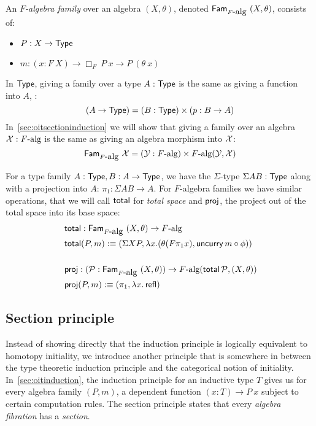 \documentclass[a4paper,10pt]{article}
\begin{document}
\begin{defn}
  An \emph{$F$-algebra family} over an algebra $(X,\theta)$, denoted
  $\mathsf{Fam}_{F\mbox{-alg}}\ (X,\theta)$, consists of:

  \begin{itemize}
  \item $P : X \to \mathsf{Type}$
  \item $m : (x : F\ X) \to \Box_F\ P\ x \to P\ (\theta\ x)$
  \end{itemize}
\end{defn}

In $\mathsf{Type}$, giving a family over a type $A : \mathsf{Type}$ is the same as
giving a function into $A$, \ie:
$$
(A \to \mathsf{Type}) = (B : \mathsf{Type}) \times (p : B \to A)
$$
In~\cref{sec:oitsectioninduction} we will show that giving a
family over an algebra $\mathcal{X} : F\mbox{-alg}$ is the same as giving an
algebra morphism into $\mathcal{X}$:
$$
\mathsf{Fam}_{F\mbox{-alg}}\ \mathcal{X} = (\mathcal{Y} : F\mbox{-alg}) \times F\mbox{-alg}(\mathcal{Y},\mathcal{X})
$$

For a type family $A : \mathsf{Type}, B : A \to \mathsf{Type}$, we have the
$\Sigma$-type $\Sigma A B : \mathsf{Type}$ along with a projection into $A$:
$\pi_1 : \Sigma A B \to A$. For $F$-algebra families we have similar
operations, that we will call $\operatorname{\mathsf{total}}$ for \emph{total space} and
$\operatorname{\mathsf{proj}}$, the project out of the total space into its base space:
\begin{align*}
  &\operatorname{\mathsf{total}} : \mathsf{Fam}_{F\mbox{-alg}}\ (X,\theta) \to F\mbox{-alg} \\
  &\operatorname{\mathsf{total}} (P, m) :\equiv (\Sigma X P, \lambda x . (\theta (F \pi_1 x) , \operatorname{\mathsf{uncurry}} m \circ \phi)) \\
  &\\
  &\operatorname{\mathsf{proj}} : (\mathcal{P} : \mathsf{Fam}_{F\mbox{-alg}}\ (X,\theta)) \to F\mbox{-alg}(\operatorname{\mathsf{total}} \mathcal{P}, (X,\theta)) \\
  &\operatorname{\mathsf{proj}} (P, m) :\equiv (\pi_1 , \lambda x . \operatorname{\mathsf{refl}})
\end{align*}

\subsection{Section principle}
\label{sec:oitsection}

Instead of showing directly that the induction principle is logically
equivalent to homotopy initiality, we introduce another principle that
is somewhere in between the type theoretic induction principle and the
categorical notion of initiality. In~\cref{sec:oitinduction}, the
induction principle for an inductive type $T$ gives us for every
algebra family $(P,m)$, a dependent function $(x : T) \to P\ x$
subject to certain computation rules. The section principle states
that every \emph{algebra fibration} has a \emph{section}.
\end{document}
